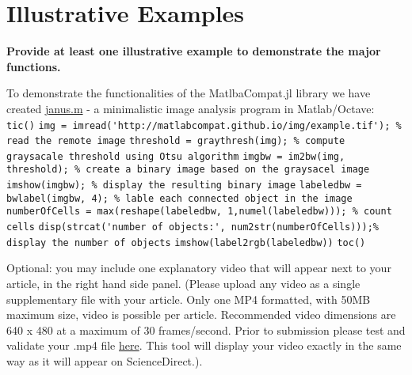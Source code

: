 \section{Illustrative Examples}
\label{} 

\textbf{Provide at least one illustrative example to demonstrate the major functions.}

To demonstrate the functionalities of the MatlbaCompat.jl library we have created \href{https://github.com/MatlabCompat/MatlabCompat.jl/blob/dev/test/janus.m}{janus.m} - a minimalistic image analysis program in Matlab/Octave:
\verb|tic()|
\verb|img = imread('http://matlabcompat.github.io/img/example.tif'); % read the remote image|
\verb|threshold = graythresh(img); % compute graysacale threshold using Otsu algorithm|
\verb|imgbw = im2bw(img, threshold); % create a binary image based on the graysacel image|
\verb|imshow(imgbw); % display the resulting binary image|
\verb|labeledbw = bwlabel(imgbw, 4); % lable each connected object in the image|
\verb|numberOfCells = max(reshape(labeledbw, 1,numel(labeledbw))); % count cells|
\verb|disp(strcat('number of objects:', num2str(numberOfCells)));% display the number of objects|
\verb|imshow(label2rgb(labeledbw))|
\verb|toc()|


Optional: you may include one explanatory video that will appear next to your article, in the right hand side panel. (Please upload any video as a single supplementary file with your article. Only one MP4 formatted, with 50MB maximum size, video is possible per article. Recommended video dimensions are 640 x 480 at a maximum of 30 frames/second. Prior to submission please test and validate your .mp4 file \href{http://elsevier-apps.sciverse.com/GadgetVideoPodcastPlayerWeb/verification}{here}. This tool will display your video exactly in the same way as it will appear on ScienceDirect.).

  
  
  